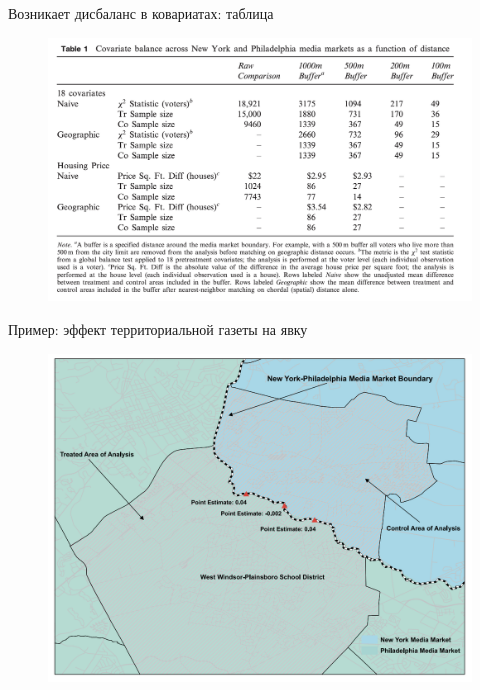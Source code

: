 \begin{frame}{Возникает дисбаланс в ковариатах: таблица}
    \begin{figure}
        \centering
        \includegraphics[width=\textwidth]{Images/geo_balance.png}
    \end{figure}
\end{frame}

\begin{frame}{Пример: эффект территориальной газеты на явку}
    \begin{figure}
        \centering
        \includegraphics[width=\textwidth]{Images/geo.png}
    \end{figure}
\end{frame}


